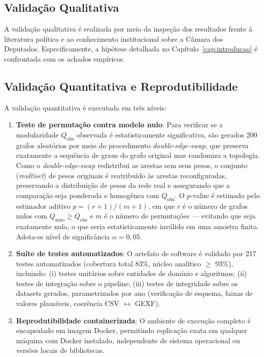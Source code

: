 \documentclass[
      12pt,
      a4paper,
      openright,
      oneside,
      chapter=TITLE,
      section=TITLE,
      english,
      french,
      spanish,
      brazilian
    ]{abntex2}
\begin{document}
    \subsection{Validação Qualitativa}
    
    A validação qualitativa é realizada por meio da inspeção dos resultados frente à literatura política e ao conhecimento institucional sobre a Câmara dos Deputados. Especificamente, a hipótese detalhada no Capítulo~\ref{cap:introducao} é confrontada com os achados empíricos.
    
    \subsection{Validação Quantitativa e Reprodutibilidade}
    
    A validação quantitativa é executada em três níveis:
    
    \begin{enumerate}[label=\alph*)]
        \item \textbf{Teste de permutação contra modelo nulo}: 
        Para verificar se a modularidade $Q_{\text{obs}}$ observada é estatisticamente significativa, são gerados 200 grafos aleatórios por meio do procedimento \textit{double-edge-swap}, que preserva exatamente a sequência de graus do grafo original mas randomiza a topologia. Como o \textit{double-edge-swap} redistribui as arestas sem seus pesos, o conjunto (\textit{multiset}) de pesos originais é reatribuído às arestas reconfiguradas, preservando a distribuição de pesos da rede real e assegurando que a comparação seja ponderada e homogênea com $Q_{\text{obs}}$. O $p$-value é estimado pelo estimador aditivo $p = (r+1)/(m+1)$, em que $r$ é o número de grafos nulos com $Q_{\text{nulo}} \geq Q_{\text{obs}}$ e $m$ é o número de permutações --- evitando que seja exatamente nulo, o que seria estatisticamente inválido em uma amostra finita. Adota-se nível de significância $\alpha = 0{,}05$.
        
        \item \textbf{Suíte de testes automatizados}:
        O artefato de software é validado por 217 testes automatizados (cobertura total 83\%, núcleo analítico $\geq$ 93\%), incluindo: (i) testes unitários sobre entidades de domínio e algoritmos; (ii) testes de integração sobre o pipeline; (iii) testes de integridade sobre os datasets gerados, parametrizados por ano (verificação de esquema, faixas de valores plausíveis, coerência CSV $\leftrightarrow$ GEXF).
    
        \item \textbf{Reprodutibilidade containerizada}:
        O ambiente de execução completo é encapsulado em imagem Docker, permitindo replicação exata em qualquer máquina com Docker instalado, independente de sistema operacional ou versões locais de bibliotecas.
    \end{enumerate}
    
\end{document}
